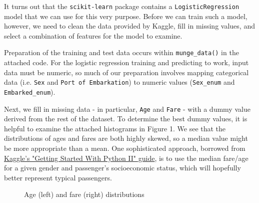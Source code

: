 \documentclass[12pt]{report}
\begin{document}
It turns out that the \verb+scikit-learn+ package contains a \verb+LogisticRegression+ model that we can use for this very purpose. Before we can train such a model, however, we need to clean the
data provided by Kaggle, fill in missing values, and select a combination of features for the model to examine.

Preparation of the training and test data occurs within \verb+munge_data()+ in the attached code. For the logistic regression training and predicting to work, input data must be numeric, so much
of our preparation involves mapping categorical data (i.e. \verb+Sex+ and \verb+Port of Embarkation+) to numeric values (\verb+Sex_enum+ and \verb+Embarked_enum+).

Next, we fill in missing data - in particular, \verb+Age+ and \verb+Fare+ - with a dummy value derived from the rest of the dataset. To determine the best dummy values, it is helpful to examine
the attached histograms in Figure 1. We see that the distributions of ages and fares are both highly skewed, so a median value might be more appropriate than a mean. One sophisticated approach,
borrowed from \href{https://www.kaggle.com/c/titanic/details/getting-started-with-python-ii}{Kaggle's "Getting Started With Python II" guide}, is to use the median fare/age for a given gender
and passenger's socioeconomic status, which will hopefully better represent typical passengers.

\begin{figure}
\centering
{}
\caption{Age (left) and fare (right) distributions}
\end{figure}
\end{document}
